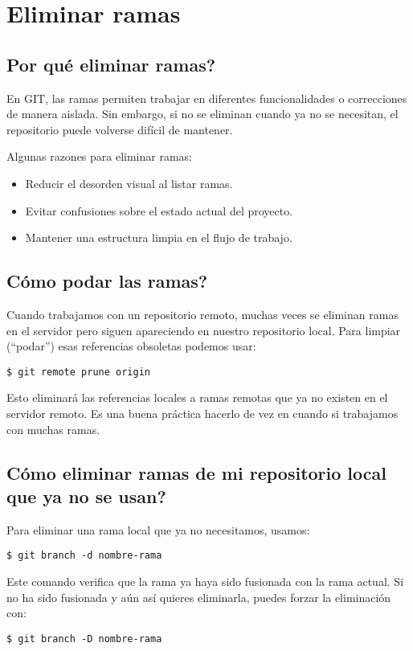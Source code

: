 \section{Eliminar ramas}

    \subsection{Por qu\'e eliminar ramas?}
        En GIT, las ramas permiten trabajar en diferentes funcionalidades o correcciones de manera aislada. Sin embargo, si no se eliminan cuando ya no se necesitan, el repositorio puede volverse dif\'icil de mantener.
        
        Algunas razones para eliminar ramas:
        \begin{itemize}
            \item Reducir el desorden visual al listar ramas.
            \item Evitar confusiones sobre el estado actual del proyecto.
            \item Mantener una estructura limpia en el flujo de trabajo.
        \end{itemize}

    \subsection{C\'omo podar las ramas?}
        Cuando trabajamos con un repositorio remoto, muchas veces se eliminan ramas en el servidor pero siguen apareciendo en nuestro repositorio local. Para limpiar (``podar'') esas referencias obsoletas podemos usar:
        \begin{lstlisting}
$ git remote prune origin
        \end{lstlisting}
        Esto eliminar\'a las referencias locales a ramas remotas que ya no existen en el servidor remoto. Es una buena pr\'actica hacerlo de vez en cuando si trabajamos con muchas ramas.

    \subsection{C\'omo eliminar ramas de mi repositorio local que ya no se usan?}
        Para eliminar una rama local que ya no necesitamos, usamos:
        \begin{lstlisting}
$ git branch -d nombre-rama
        \end{lstlisting}
        Este comando verifica que la rama ya haya sido fusionada con la rama actual. Si no ha sido fusionada y aún así quieres eliminarla, puedes forzar la eliminaci\'on con:
        \begin{lstlisting}
$ git branch -D nombre-rama
        \end{lstlisting}

